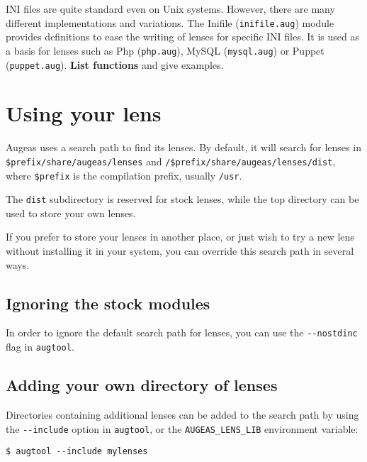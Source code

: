 INI files are quite standard even on Unix systems. However, there are many different implementations and variations. The Inifile (\verb!inifile.aug!) module provides definitions to ease the writing of lenses for specific INI files. It is used as a basis for lenses such as Php (\verb!php.aug!), MySQL (\verb!mysql.aug!) or Puppet (\verb!puppet.aug!). \textbf{List functions} and give examples.

\section{Using your lens}

Augeas uses a search path to find its lenses. By default, it will search for lenses in \verb!$prefix/share/augeas/lenses! and \nolinkurl{/$prefix/share/augeas/lenses/dist}, where \verb!$prefix! is the compilation prefix, usually \nolinkurl{/usr}.

The \verb!dist! subdirectory is reserved for stock lenses, while the top directory can be used to store your own lenses.

If you prefer to store your lenses in another place, or just wish to try a new lens without installing it in your system, you can override this search path in several ways.

\subsection{Ignoring the stock modules}


In order to ignore the default search path for lenses, you can use the \verb!--nostdinc! flag in \verb!augtool!.

\subsection{Adding your own directory of lenses}

 

Directories containing additional lenses can be added to the search path by using the \verb!--include! option in \verb!augtool!, or the \verb!AUGEAS_LENS_LIB! environment variable:

\begin{verbatim}
$ augtool --include mylenses
\end{verbatim}


